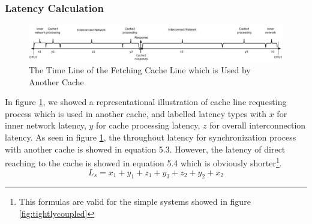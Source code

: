 \subsubsection{Latency Calculation}
	\begin{figure}[h!]
	    \centering
	    \includegraphics[width=1.1\textwidth]{img/timing_diagram.jpg}
	    \caption{The Time Line of the Fetching Cache Line which is Used by Another Cache}
	    \label{fig:timeline}
	\end{figure}
In figure \ref{fig:timeline}, we showed a representational illustration of cache line requesting process which is used in another cache, and labelled latency types with $x$ for inner network latency, $y$ for cache processing latency, $z$ for overall interconnection latency. As seen in figure \ref{fig:timeline}, the throughout latency for synchronization process with another cache is showed in equation 5.3. However, the latency of direct reaching to the cache is showed in equation 5.4 which is obviously shorter\footnote{This formulas are valid for the simple systems showed in figure \ref{fig:tightlycoupled}}. 
\begin{equation}
L_{s}=x_{1} + y_{1} + z_{1} + y_{3} + z_{2} + y_{2} + x_{2}
\end{equation}

